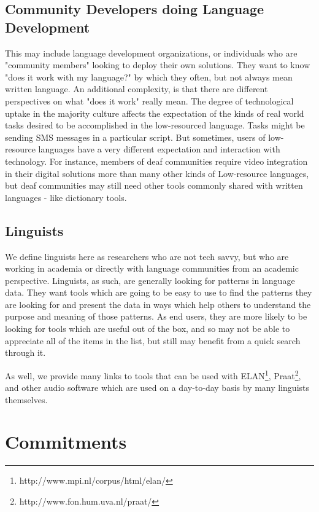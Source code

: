 \documentclass[10pt, a4paper]{article}
\begin{document}
\subsection{Community Developers doing Language Development}

This may include language development organizations, or individuals who are "community members" looking to deploy their own solutions. They want to know "does it work with my language?" by which they often, but not always mean written language. An additional complexity, is that there are different perspectives on what "does it work" really mean. The degree of technological uptake in the majority culture affects the expectation of the kinds of real world tasks desired to be accomplished in the low-resourced language. Tasks might be sending SMS messages in a particular script. But sometimes, users of low-resource languages have a very different expectation and interaction with technology. For instance, members of deaf communities require video integration in their digital solutions more than many other kinds of Low-resource languages, but deaf communities may still need other tools commonly shared with written languages - like dictionary tools.

\subsection{Linguists}

We define linguists here as researchers who are not tech savvy, but who are working in academia or directly with language communities from an academic perspective. Linguists, as such, are generally looking for patterns in language data. They want tools which are going to be easy to use to find the patterns they are looking for and present the data in ways which help others to understand the purpose and meaning of those patterns. As end users, they are more likely to be looking for tools which are useful out of the box, and so may not be able to appreciate all of the items in the list, but still may benefit from a quick search through it. 

As well, we provide many links to tools that can be used with ELAN\footnote{http://www.mpi.nl/corpus/html/elan/}, Praat\footnote{http://www.fon.hum.uva.nl/praat/}, and other audio software which are used on a day-to-day basis by many linguists themselves. 

\section{Commitments}
\end{document}
